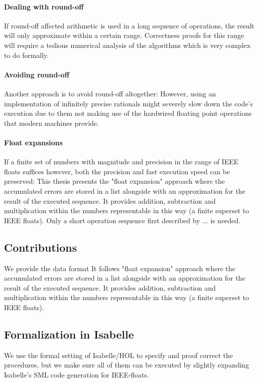 \documentclass[11pt,a4paper]{article}
\begin{document}
\paragraph{Dealing with round-off}
If round-off affected arithmetic is used in a long sequence of operations, the result will only approximate within a certain range. Correctness proofs for this range will require a tedious numerical analysis of the algorithms which is very complex to do formally.

\paragraph{Avoiding round-off}
Another approach is to avoid round-off altogether: However, using an implementation of infinitely precise rationals might severely slow down the code's execution due to them not making use of the hardwired floating point operations that modern machines provide.

\paragraph{Float expansions}
If a finite set of numbers with magnitude and precision in the range of IEEE floats suffices however, both the precision and fast execution speed can be preserved: This thesis presents the "float expansion" approach where the accumulated errors are stored in a list alongside with an approximation for the result of the executed sequence. It provides addition, subtraction and multiplication within the numbers representable in this way (a finite superset to IEEE floats).
Only a short operation sequence first described by ... is needed.

\subsection{Contributions}
We provide the data format \typmpf
It follows "float expansion" approach where the accumulated errors are stored in a list alongside with an approximation for the result of the executed sequence. It provides addition, subtraction and multiplication within the numbers representable in this way (a finite superset to IEEE floats).

\subsection{Formalization in Isabelle}
We use the formal setting of Isabelle/HOL to specify and proof correct the procedures, but we make sure all of them can be executed by slightly expanding Isabelle's SML code generation for IEEE-floats.
\end{document}
